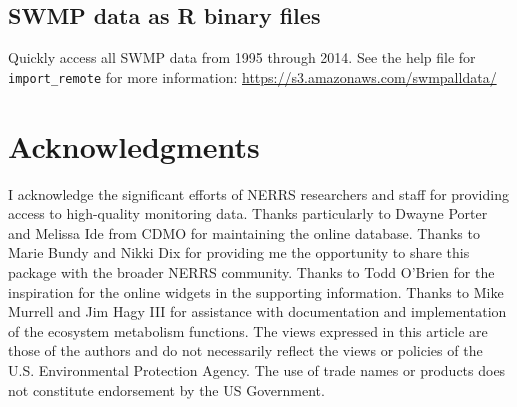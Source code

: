 \documentclass[10pt,letterpaper]{article}\usepackage[]{graphicx}\usepackage[]{color}
\begin{document}
\subsection*{\ac{SWMP} data as R binary files}

Quickly access all \ac{SWMP} data from 1995 through 2014. See the help file for \texttt{import\_remote} for more information: \href{https://s3.amazonaws.com/swmpalldata/}{https://s3.amazonaws.com/swmpalldata/}

\section*{Acknowledgments}

I acknowledge the significant efforts of \ac{NERRS} researchers and staff for providing access to high-quality monitoring data.  Thanks particularly to Dwayne Porter and Melissa Ide from \ac{CDMO} for maintaining the online database.  Thanks to Marie Bundy and Nikki Dix for providing me the opportunity to share this package with the broader \ac{NERRS} community.  Thanks to Todd O'Brien for the inspiration for the online widgets in the supporting information. Thanks to Mike Murrell and Jim Hagy III for assistance with documentation and implementation of the ecosystem metabolism functions. The views expressed in this article are those of the authors and do not necessarily reflect the views or policies of the U.S. Environmental Protection Agency.  The use of trade names or products does not constitute endorsement by the US Government.   

\nolinenumbers


\end{document}
